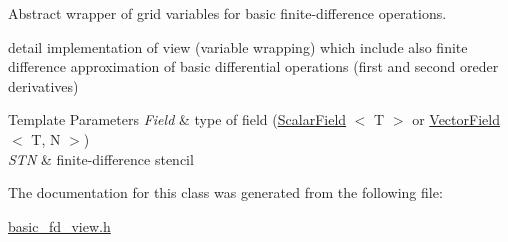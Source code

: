 Abstract wrapper of grid variables for basic finite-\/difference operations. 

detail implementation of view (variable wrapping) which include also finite difference approximation of basic differential operations (first and second oreder derivatives)


\begin{DoxyTemplParams}{Template Parameters}
{\em Field} & type of field (\hyperlink{structUintah_1_1PhaseField_1_1ScalarField}{Scalar\+Field} $<$ T $>$ or \hyperlink{structUintah_1_1PhaseField_1_1VectorField}{Vector\+Field} $<$ T, N $>$) \\
\hline
{\em S\+TN} & finite-\/difference stencil \\
\hline
\end{DoxyTemplParams}


The documentation for this class was generated from the following file\+:\begin{DoxyCompactItemize}
\item 
\hyperlink{basic__fd__view_8h}{basic\+\_\+fd\+\_\+view.\+h}\end{DoxyCompactItemize}
